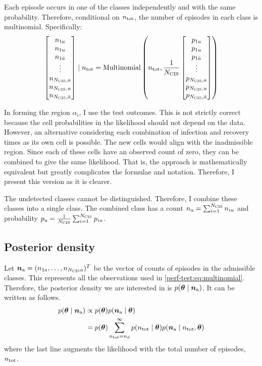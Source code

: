 \documentclass[thesis.tex]{subfiles}
\begin{document}
Each episode occurs in one of the classes independently and with the same probability.
Therefore, conditional on $n_\text{tot}$, the number of episodes in each class is multinomial.
Specifically:
\begin{align}
  \begin{bmatrix}
    n_{1a} \\ n_{1u} \\ n_{1\bar{a}} \\ \vdots \\ n_{N_\text{CIS},a} \\ n_{N_\text{CIS},u} \\ n_{N_\text{CIS},\bar{a}}
  \end{bmatrix}
  \mid n_\text{tot}
  =
  \operatorname{Multinomial}\left(
    n_\text{tot},
    \frac{1}{N_\text{CIS}}
    \begin{bmatrix}
      p_{1a} \\ p_{1u} \\ p_{1\bar{a}} \\ \vdots \\ p_{N_\text{CIS},a} \\ p_{N_\text{CIS},u} \\ p_{N_\text{CIS},\bar{a}}
    \end{bmatrix}
  \right)
  \label{perf-test:eq:multinomial}
\end{align}

In forming the region $\alpha_i$, I use the test outcomes.
This is not strictly correct because the cell probabilities in the likelihood should not depend on the data.
However, an alternative considering each combination of infection and recovery times as its own cell is possible.
The new cells would align with the inadmissible region.
Since each of these cells have an observed count of zero, they can be combined to give the same likelihood.
That is, the approach is mathematically equivalent but greatly complicates the formulae and notation.
Therefore, I present this version as it is clearer.

The undetected classes cannot be distinguished.
Therefore, I combine these classes into a single class.
The combined class has a count $n_\text{u} = \sum_{i=1}^{N_\text{CIS}} n_{iu}$ and probability $p_\text{u} = \frac{1}{N_\text{CIS}} \sum_{i=1}^{N_\text{CIS}} p_{iu}$.

\subsection{Posterior density} \label{perf-test:sec:posterior-density}

Let $\bm{n}_\text{a} = (n_{1a}, \dots, n_{N_\text{CIS} a})^T$ be the vector of counts of episodes in the admissible classes.
This represents all the observations used in \cref{perf-test:eq:multinomial}.
Therefore, the posterior density we are interested in is $p(\bm{\theta} \mid \bm{n}_\text{a})$.
It can be written as follows.
\begin{align}
p(\bm{\theta} \mid \bm{n}_\text{a})
&\propto p(\bm{\theta}) p(\bm{n}_\text{a} \mid \bm{\theta}) \\
&= p(\bm{\theta}) \sum_{n_\text{tot}=n_\text{d}}^\infty p(n_\text{tot} \mid \bm{\theta}) p(\bm{n}_\text{a} \mid n_\text{tot}, \bm{\theta})
\label{perf-test:eq:posterior1}
\end{align}
where the last line augments the likelihood with the total number of episodes, $n_\text{tot}$.
\end{document}
